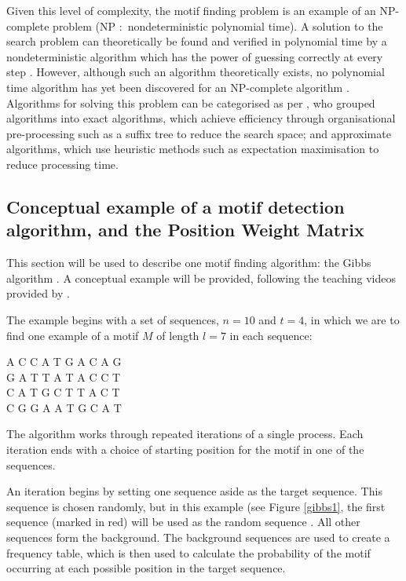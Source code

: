 \documentclass[12pt]{article}
\begin{document}
Given this level of complexity, the motif finding problem is an example of an NP-complete problem \citep{tran2014survey} (NP $:$ nondeterministic polynomial time). A solution to the search problem can theoretically be found and verified in polynomial time by a nondeterministic algorithm which has the power of guessing correctly at every step \citep{dasgupta2006algorithms}. However, although such an algorithm theoretically exists, no polynomial time algorithm has yet been discovered for an NP-complete algorithm \citep{cormen2009introduction}.  Algorithms for solving this problem can be categorised as per \citep{sun2015affinity}, who grouped algorithms into exact algorithms, which achieve efficiency through organisational pre-processing such as a suffix tree to reduce the search space; and approximate algorithms, which use heuristic methods such as expectation maximisation to reduce processing time.

\subsection{Conceptual example of a motif detection algorithm, and the Position Weight Matrix}
This section will be used to describe one motif finding algorithm: the Gibbs algorithm \citep{Lawrence1993Gibbs}. A conceptual example will be provided, following the teaching videos provided by \citep{Algoshareify}.

The example begins with a set of sequences, $n=10$ and $t=4$, in which we are to find one example of a motif $M$ of length $l=7$ in each sequence:
\begin{center}
A  C  C  A  T  G  A  C  A  G\\
G  A  T  T  A  T  A  C  C  T\\
C  A  T  G  C  T  T  A  C  T\\
C  G  G  A  A  T  G  C  A  T\\
\end{center}
The algorithm works through repeated iterations of a single process. Each iteration ends with a choice of starting position for the motif in one of the sequences.

An iteration begins by setting one sequence aside as the target sequence. This sequence is chosen randomly, but in this example (see Figure \ref{gibbs1}, the first sequence (marked in red) will be used as the random sequence . All other sequences form the background. The background sequences are used to create a frequency table, which is then used to calculate the probability of the motif occurring at each possible position in the target sequence.
\end{document}
